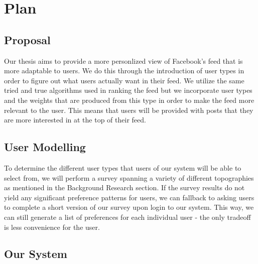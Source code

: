 
\chapter{Plan}\label{ch:plan}

\section{Proposal}

Our thesis aims to provide a more personlized view of Facebook's feed that is more adaptable to users. We do this through the introduction of user types in order to figure out what users actually want in their feed. We utilize the same tried and true algorithms used in ranking the feed but we incorporate user types and the weights that are produced from this type in order to make the feed more relevant to the user. This means that users will be provided with posts that they are more interested in at the top of their feed. 

\section{User Modelling}

To determine the different user types that users of our system will be able to select from, we will perform a survey spanning a variety of different topographies as mentioned in the Background Research section. If the survey results do not yield any significant preference patterns for users, we can fallback to asking users to complete a short version of our survey upon login to our system. This way, we can still generate a list of preferences for each individual user - the only tradeoff is less convenience for the user.

\section{Our System}

